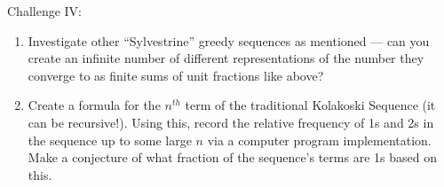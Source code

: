 \documentclass[titlepage,a4paper]{article}
\begin{document}
Challenge IV:
\begin{enumerate}
\item{Investigate other “Sylvestrine” greedy sequences as mentioned --- can you create an infinite number of different representations of the number they converge to as finite sums of unit fractions like above?}
\item{Create a formula for the \(n^{th}\) term of the traditional Kolakoski Sequence (it can be recursive!). Using this, record the relative frequency of 1s and 2s in the sequence up to some large \(n\) via a computer program implementation. Make a conjecture of what fraction of the sequence’s terms are 1s based on this.}
\end{enumerate}
\end{document}
